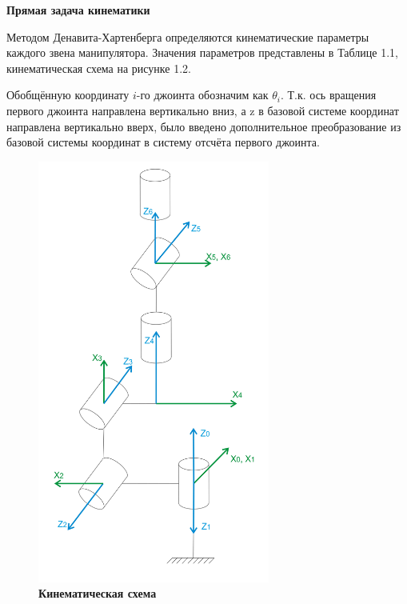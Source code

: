 \documentclass[a4paper,14pt,russian]{extreport} \usepackage{extsizes}
\begin{document}
		\textbf{Прямая задача кинематики}
	
		Методом Денавита-Хартенберга определяются кинематические параметры каждого звена манипулятора. Значения параметров представлены в Таблице 1.1, кинематическая схема на рисунке 1.2. 
		
		Обобщённую координату $i$-го джоинта обозначим как $\theta_{i}$.
		Т.к. ось вращения первого джоинта направлена вертикально вниз, а z в базовой системе координат направлена вертикально вверх, было введено дополнительное преобразование из базовой системы координат в систему отсчёта первого джоинта.
		
		\begin{figure}[h!]
			\centering		 
			\includegraphics[width=3in]{./img/img31.JPG}	
			\caption{
				\textbf{Кинематическая схема
				}     
			}
			\label{fig_img14}
		\end{figure}
		
\end{document}
